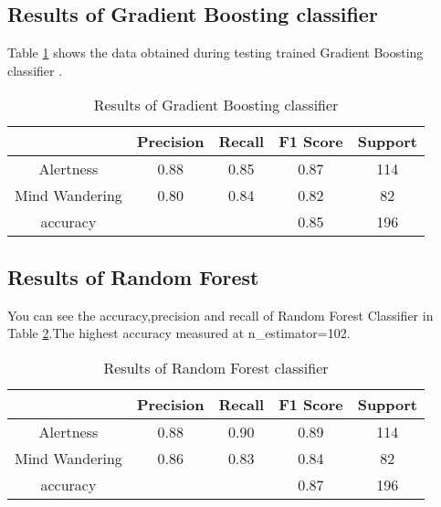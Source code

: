 \subsection{Results of Gradient Boosting classifier }
Table \ref{tab:Gradient_Boosting_classifier_res} shows the data obtained during testing trained Gradient Boosting classifier .
\begin{table}[ht]
    \centering
    \caption{Results of Gradient Boosting classifier }
    {\renewcommand{\arraystretch}{1.2}
    \begin{tabular}{ccccc}
       \hline
       \hline
         & Precision & Recall & F1 Score & Support \\
        \hline
        
         Alertness      & 0.88     & 0.85     & 0.87       &114 \\
         Mind Wandering      & 0.80     & 0.84     & 0.82        &82 \\
    accuracy      &         &           & 0.85       &196 \\
          \hline
          \hline
    \end{tabular}
    }
    \label{tab:Gradient_Boosting_classifier_res}
\end{table}

\subsection{Results of Random Forest }
You can see the accuracy,precision and recall of Random Forest Classifier in Table \ref{tab:rf_res}.The highest accuracy measured at n\_estimator=102. 
\begin{table}[ht]
    \centering
    \caption{Results of Random Forest classifier }
    {\renewcommand{\arraystretch}{1.2}
    \begin{tabular}{ccccc}
       \hline
       \hline
         & Precision & Recall & F1 Score & Support \\
        \hline
          Alertness &      0.88     & 0.90  &    0.89      & 114 \\
         Mind Wandering    &   0.86     & 0.83     & 0.84       & 82 \\
    accuracy    &           &           & 0.87      & 196 \\
          \hline
          \hline
    \end{tabular}
    }
    \label{tab:rf_res}
\end{table}

